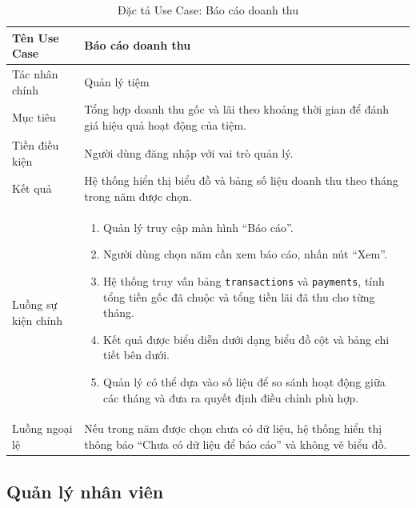 \documentclass[13pt,a4paper]{extreport}
\begin{document}
\begin{table}[H]
\centering
\caption{Đặc tả Use Case: Báo cáo doanh thu}
\label{tab:uc-reports}
\begin{tabular}{p{4cm}p{10cm}}
\hline
Tên Use Case & Báo cáo doanh thu\\
\hline
Tác nhân chính & Quản lý tiệm\\
Mục tiêu & Tổng hợp doanh thu gốc và lãi theo khoảng thời gian để đánh giá hiệu quả hoạt động của tiệm.\\
Tiền điều kiện & Người dùng đăng nhập với vai trò quản lý.\\
Kết quả & Hệ thống hiển thị biểu đồ và bảng số liệu doanh thu theo tháng trong năm được chọn.\\
\hline
Luồng sự kiện chính &
\begin{enumerate}
  \item Quản lý truy cập màn hình ``Báo cáo''.
  \item Người dùng chọn năm cần xem báo cáo, nhấn nút ``Xem''.
  \item Hệ thống truy vấn bảng \texttt{transactions} và \texttt{payments}, tính tổng tiền gốc đã chuộc và tổng tiền lãi đã thu cho từng tháng.
  \item Kết quả được biểu diễn dưới dạng biểu đồ cột và bảng chi tiết bên dưới.
  \item Quản lý có thể dựa vào số liệu để so sánh hoạt động giữa các tháng và đưa ra quyết định điều chỉnh phù hợp.
\end{enumerate}\\
\hline
Luồng ngoại lệ &
Nếu trong năm được chọn chưa có dữ liệu, hệ thống hiển thị thông báo ``Chưa có dữ liệu để báo cáo'' và không vẽ biểu đồ.\\
\hline
\end{tabular}
\end{table}

\subsection*{Quản lý nhân viên}
\end{document}
